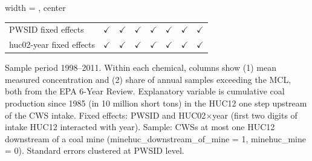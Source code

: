\begin{table}[htbp]
\begin{adjustbox}{width = \textwidth, center}
\begin{tabular}{lccccccc}
          \\
         
         PWSID fixed effects                 & $\checkmark$           & $\checkmark$          & $\checkmark$  & $\checkmark$  & $\checkmark$        & $\checkmark$  & $\checkmark$\\   
         huc02-year fixed effects            & $\checkmark$           & $\checkmark$          & $\checkmark$  & $\checkmark$  & $\checkmark$        & $\checkmark$  & $\checkmark$\\   
         
         \bottomrule
         
      \end{tabular}
      
      
      
   \end{adjustbox}
      {\tiny\linespread{1}\selectfont \par \raggedright 
   Sample period 1998--2011. Within each chemical, columns show (1) mean measured concentration and (2) share of annual samples exceeding the MCL, both from the EPA 6-Year Review. Explanatory variable is cumulative coal production since 1985 (in 10 million short tons) in the HUC12 one step upstream of the CWS intake. Fixed effects: PWSID and HUC02$\times$year (first two digits of intake HUC12 interacted with year). Sample: CWSs at most one HUC12 downstream of a coal mine (minehuc\_downstream\_of\_mine = 1, minehuc\_mine = 0). Standard errors clustered at PWSID level.}
   
\end{table}


